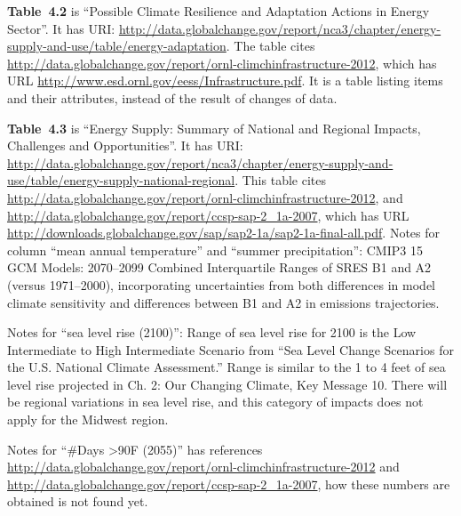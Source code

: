 \mbox{}

\textbf{Table~4.2} is ``Possible Climate Resilience and Adaptation Actions in Energy Sector''. It has URI: \url{http://data.globalchange.gov/report/nca3/chapter/energy-supply-and-use/table/energy-adaptation}.
The table cites \url{http://data.globalchange.gov/report/ornl-climchinfrastructure-2012}, which has URL \url{http://www.esd.ornl.gov/eess/Infrastructure.pdf}.
It is a table listing items and their attributes, instead of the result of changes of data.

\textbf{Table~4.3} is ``Energy Supply: Summary of National and Regional Impacts, Challenges and Opportunities''. It has
URI: \url{http://data.globalchange.gov/report/nca3/chapter/energy-supply-and-use/table/energy-supply-national-regional}.
This table cites \url{http://data.globalchange.gov/report/ornl-climchinfrastructure-2012}, and \url{http://data.globalchange.gov/report/ccsp-sap-2_1a-2007}, which has URL \url{http://downloads.globalchange.gov/sap/sap2-1a/sap2-1a-final-all.pdf}.
Notes for column ``mean annual temperature'' and ``summer precipitation'': CMIP3 15 GCM Models: 2070--2099 Combined Interquartile Ranges of SRES B1 and A2 (versus 1971--2000), incorporating uncertainties from both differences in model climate sensitivity and differences between B1 and A2 in emissions trajectories.

Notes for ``sea level rise (2100)'': Range of sea level rise for 2100 is the Low Intermediate to High Intermediate Scenario from ``Sea Level Change Scenarios for the U.S. National Climate Assessment.'' Range is similar to the 1 to 4 feet of sea level rise projected in Ch. 2: Our Changing Climate, Key Message 10. There will be regional variations in sea level rise, and this category of impacts does not apply for the Midwest region.

Notes for ``\#Days >90F (2055)'' has references \url{http://data.globalchange.gov/report/ornl-climchinfrastructure-2012} and \url{http://data.globalchange.gov/report/ccsp-sap-2_1a-2007}, how these numbers are obtained is not found yet.
